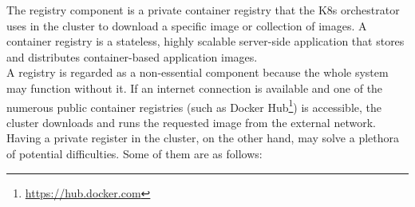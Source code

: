 
The registry component is a private container registry that the K8s orchestrator
uses in the cluster to download a specific image or collection of images. A container
registry is a stateless, highly scalable server-side application that stores and
distributes container-based application images\cite{docker_registry}. \\ %
A registry is regarded as a non-essential component because the whole system may
function without it. If an internet connection is available and one of the
numerous public container registries (such as Docker Hub\footnote{\url{https://hub.docker.com}})
is accessible, the cluster downloads and runs the requested image from the external
network. Having a private register in the cluster, on the other hand, may solve
a plethora of potential difficulties. Some of them are as follows:

